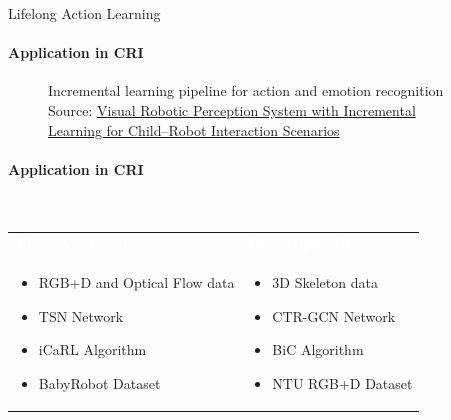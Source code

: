 \documentclass[aspectratio=169]{beamer}
\begin{document}
\begin{frame}{Lifelong Action Learning}
      \framesubtitle{Application in CRI}%
      
      \begin{figure}[h!]
      \centering
      \caption{Incremental learning pipeline for action and emotion recognition Source: \href{https://doi.org/10.3390/technologies9040086}{Visual Robotic Perception System with Incremental Learning for Child–Robot Interaction Scenarios}}
      \end{figure} 
\end{frame}

\begin{frame}
      \framesubtitle{Application in CRI}%

      \begin{block}{~\vspace{0.7cm}}
      \begin{center}
      \vspace{-0.8cm}
      \begin{tabular}{p{}|p{}}
      \textcolor{white}{\bf Their Approach} & \textcolor{white}{\bf Our Approach} \\
      \begin{itemize}
              \item RGB+D and Optical Flow data
              \item TSN Network
              \item iCaRL Algorithm
              \item BabyRobot Dataset
      \end{itemize} &
      \begin{itemize}
              \item 3D Skeleton data
              \item CTR-GCN Network
              \item BiC Algorithm
              \item NTU RGB+D Dataset
      \end{itemize}\\ 
      \end{tabular}
      \end{center}
      \end{block}
\end{frame}
\end{document}

